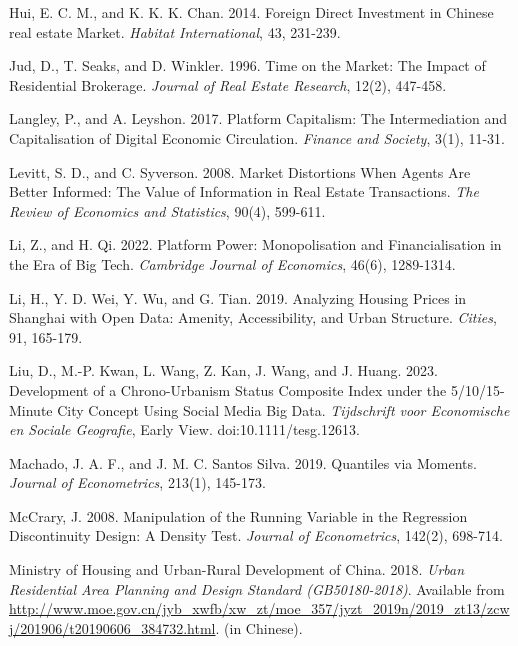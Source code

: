\documentclass[11pt]{article}
\begin{document}
\begin{singlespace}
\begin{thebibliography}{}
Hui, E. C. M., and K. K. K. Chan. 2014. Foreign Direct Investment in Chinese real estate Market. \textit{Habitat International}, 43, 231-239. 

Jud, D., T. Seaks, and D. Winkler. 1996. Time on the Market: The Impact of Residential Brokerage. \textit{Journal of Real Estate Research}, 12(2), 447-458. 

Langley, P., and A. Leyshon. 2017. Platform Capitalism: The Intermediation and Capitalisation of Digital Economic Circulation. \textit{Finance and Society}, 3(1), 11-31. 

Levitt, S. D., and C. Syverson. 2008. Market Distortions When Agents Are Better Informed: The Value of Information in Real Estate Transactions. \textit{The Review of Economics and Statistics}, 90(4), 599-611. 

Li, Z., and H. Qi. 2022. Platform Power: Monopolisation and Financialisation in the Era of Big Tech. \textit{Cambridge Journal of Economics}, 46(6), 1289-1314. 

Li, H., Y. D. Wei, Y. Wu, and G. Tian. 2019. Analyzing Housing Prices in Shanghai with Open Data: Amenity, Accessibility, and Urban Structure. \textit{Cities}, 91, 165-179.

Liu, D., M.-P. Kwan, L. Wang, Z. Kan, J. Wang, and J. Huang. 2023. Development of a Chrono-Urbanism Status Composite Index under the 5/10/15-Minute City Concept Using Social Media Big Data. \textit{Tijdschrift voor Economische en Sociale Geografie}, Early View. doi:10.1111/tesg.12613.

Machado, J. A. F., and J. M. C. Santos Silva. 2019. Quantiles via Moments. \textit{Journal of Econometrics}, 213(1), 145-173. 

McCrary, J. 2008. Manipulation of the Running Variable in the Regression Discontinuity Design: A Density Test. \textit{Journal of Econometrics}, 142(2), 698-714. 

Ministry of Housing and Urban-Rural Development of China. 2018. \textit{Urban Residential Area Planning and Design Standard (GB50180-2018)}. Available from \url{http://www.moe.gov.cn/jyb_xwfb/xw_zt/moe_357/jyzt_2019n/2019_zt13/zcwj/201906/t20190606_384732.html}. (in Chinese). 


\end{thebibliography}
\end{singlespace}
\end{document}
